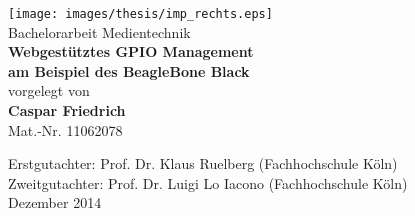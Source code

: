 \documentclass[thesis.tex]{subfiles}
\begin{document}
\begin{titlepage}
\begin{center}

\texttt{[image: images/thesis/imp\_rechts.eps]}\\[3cm]

Bachelorarbeit Medientechnik\\[0.5cm]
{\sffamily \bfseries \Huge Webgestütztes GPIO Management\\[0.25cm]
am Beispiel des BeagleBone Black}\\[2cm]

vorgelegt von\\[0.5cm]
\textbf{Caspar Friedrich}\\[0.5cm]
Mat.-Nr. 11062078\\[0.5cm]

\vfill

Erstgutachter: Prof. Dr. Klaus Ruelberg (Fachhochschule Köln)\\[0.5cm]
Zweitgutachter: Prof. Dr. Luigi Lo Iacono (Fachhochschule Köln)\\[0.5cm]
Dezember 2014

\end{center}
\end{titlepage}
\end{document}
